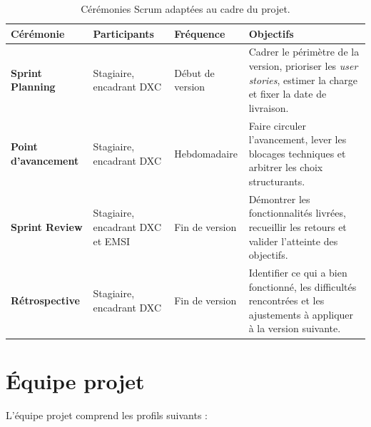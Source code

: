 \documentclass[12pt,a4paper]{report}
\begin{document}
\begin{table}[H]
\centering
\caption{Cérémonies Scrum adaptées au cadre du projet.}
\begin{tabularx}{\textwidth}{>{\bfseries}L{2.6cm}L{2.8cm}L{2.4cm}Y}
\toprule
Cérémonie & Participants & Fréquence & Objectifs \\
\midrule
Sprint Planning & Stagiaire, encadrant DXC & Début de version & Cadrer le périmètre de la version, prioriser les \textit{user stories}, estimer la charge et fixer la date de livraison. \\
Point d'avancement & Stagiaire, encadrant DXC & Hebdomadaire & Faire circuler l'avancement, lever les blocages techniques et arbitrer les choix structurants. \\
Sprint Review & Stagiaire, encadrant DXC et EMSI & Fin de version & Démontrer les fonctionnalités livrées, recueillir les retours et valider l'atteinte des objectifs. \\
Rétrospective & Stagiaire, encadrant DXC & Fin de version & Identifier ce qui a bien fonctionné, les difficultés rencontrées et les ajustements à appliquer à la version suivante. \\
\bottomrule
\end{tabularx}
\label{tab:ceremonies}
\end{table}

\section{Équipe projet}
L'équipe projet comprend les profils suivants :
\end{document}

